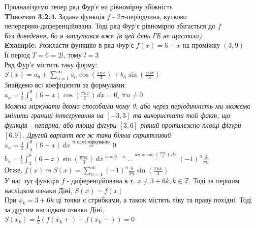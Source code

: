 \documentclass[a4paper, 10pt]{article}
\def\hugespace{\vspace{5mm} \\}
\theoremstyle{theoremdd}
\theoremstyle{theoremdd}
\theoremstyle{theoremdd}
\theoremstyle{theoremdd}
\theoremstyle{theoremdd}
\theoremstyle{theoremdd}
\theoremstyle{theoremdd}
\theoremstyle{theoremdd}
\begin{document}
Проаналізуємо тепер ряд Фур'є на рівномірну збіжність\\
\textbf{Theorem 3.2.4.} Задана функція $f$ - $2\pi$-періодчина, кусково \\ неперервно-диференційована. Тоді ряд Фур'є рівномірно збігається до $f$\\
\textit{Без доведення, бо я заплутався вже (в цей день ГБ не щастило)}
\hugespace
\textbf{Example.} Розкласти функцію в ряд Фур'є $f(x) = 6-x$ на проміжку $(3, 9)$\\
Її період $T = 6 = 2l$, тому $l=3$\\
Ряд Фур'є містить таку форму:\\
$\displaystyle S(x) = a_0 + \sum_{n=1}^{\infty} a_n \cos \left(\frac{\pi n x}{3} \right) + b_n \sin \left(\frac{\pi n x}{3} \right)$\\
Знайдемо всі коефіцієнти за формулами:\\
$\displaystyle a_n = \frac{1}{3} \int_{3}^{9} (6-x) \cos \left(\frac{\pi n x}{3} \right) \,dx = 0$, $\forall n \neq 0$\\
\textit{Можна міркувати двома способами чому 0: або через періодичність ми можемо змінити границі інтегрування на $[-3,3]$ та використати той факт, що функція - непарна; або площа фігури $[3,6]$ рівний протилежно площі фігури $[6.9]$. Другий варіант все ж таки більш сприятливий}\\
$\displaystyle a_n = \frac{1}{3} \int_{3}^{9} (6-x) \,dx \overset{\textrm{ті самі міркування}}{=} 0$\\
$\displaystyle b_n = \frac{1}{3} \int_{3}^{9} (6-x) \sin \left(\frac{\pi n x}{3} \right) \,dx \overset{u = 6-x}{=} \dots \overset{dv = \sin \left(\frac{\pi n x}{3} \right) \,dx}{=} (-1)^n \frac{6}{\pi n}$\\
Отже, $\displaystyle f(x) \leadsto S(x) = \sum_{n=1}^{\infty} (-1)^n\frac{6}{\pi n} \sin \left(\frac{\pi n x}{3} \right)$\\
У нас тут функція $f$ - диференційована в т. $x \neq 3 + 6k, k \in \mathbb{Z}$. Тоді за першим наслідком ознаки Діні, $S(x) = f(x)$\\
При $x_k = 3 + 6k$ ці точки є стрибками, а також містять ліву та праву похідні. Тоді за другим наслідком ознаки Діні, \\ $S(x_k) = \displaystyle \frac{1}{2} (f(x_k+) + f(x_k-)) = 0$
\end{document}
